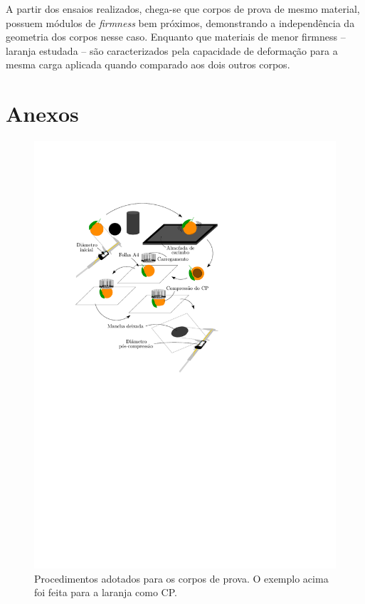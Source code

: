 \documentclass[a4paper, brazilian]{article}
\begin{document}
	A partir dos ensaios realizados, chega-se que corpos de prova de mesmo material, possuem módulos de \textit{firmness} bem próximos, demonstrando a independência da geometria dos corpos nesse caso. Enquanto que materiais de  menor firmness -- laranja estudada -- são caracterizados pela capacidade de deformação para a mesma carga aplicada quando comparado aos dois outros corpos.
	
	\section{Anexos}
	
	\begin{figure}[H]
		\centering
		\includegraphics[scale=1]{images/xp3}
		\caption{Procedimentos adotados para os corpos de prova. O exemplo acima foi feita para a laranja como CP.}
		\label{fig:method}
	\end{figure}
\end{document}
